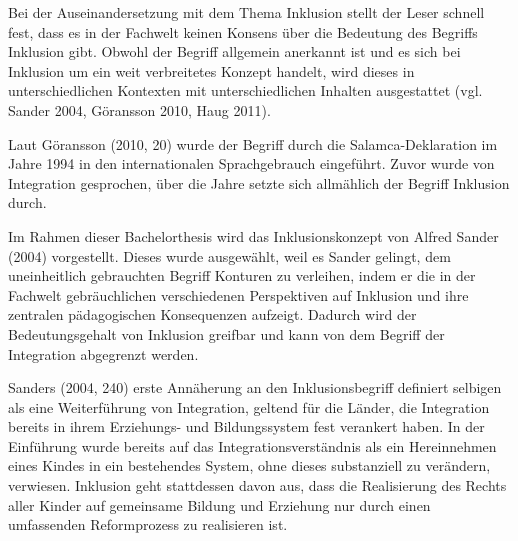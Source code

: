 Bei der Auseinandersetzung mit dem Thema Inklusion stellt der Leser schnell fest, dass es in der Fachwelt keinen Konsens über die Bedeutung des Begriffs Inklusion gibt. Obwohl der Begriff allgemein anerkannt ist und es sich bei Inklusion um ein weit verbreitetes Konzept handelt, wird dieses in unterschiedlichen Kontexten mit unterschiedlichen Inhalten ausgestattet (vgl. Sander 2004, Göransson 2010, Haug 2011). 

Laut Göransson (2010, 20) wurde der Begriff durch die Salamca-Deklaration im Jahre 1994 in den internationalen Sprachgebrauch eingeführt. Zuvor wurde von Integration gesprochen, über die Jahre setzte sich allmählich der Begriff Inklusion durch.

Im Rahmen dieser Bachelorthesis wird das Inklusionskonzept von Alfred Sander (2004) vorgestellt. Dieses wurde ausgewählt, weil es Sander gelingt, dem uneinheitlich gebrauchten Begriff Konturen zu verleihen, indem er die in der Fachwelt gebräuchlichen verschiedenen Perspektiven auf Inklusion und ihre zentralen pädagogischen Konsequenzen aufzeigt. Dadurch wird der Bedeutungsgehalt von Inklusion greifbar und kann von dem Begriff der Integration abgegrenzt werden.

Sanders (2004, 240) erste Annäherung an den Inklusionsbegriff  definiert selbigen als eine Weiterführung von Integration, geltend für die Länder, die Integration bereits in ihrem Erziehungs- und Bildungssystem fest verankert haben. In der Einführung wurde bereits auf das Integrationsverständnis als ein Hereinnehmen eines Kindes in ein bestehendes System, ohne dieses substanziell zu verändern, verwiesen. Inklusion geht stattdessen davon aus, dass die Realisierung des Rechts aller Kinder auf gemeinsame Bildung und Erziehung nur durch einen umfassenden Reformprozess zu realisieren ist.
 
